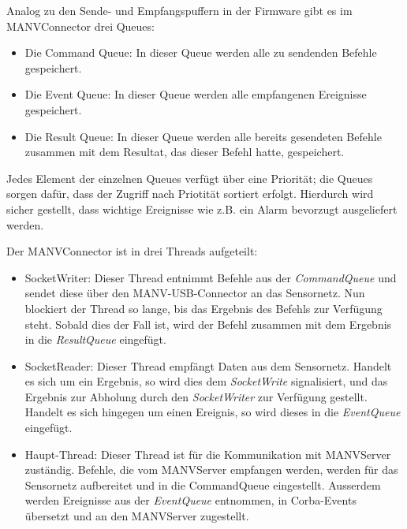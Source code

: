 Analog zu den Sende- und Empfangspuffern in der Firmware gibt es im MANVConnector drei Queues:

\begin{itemize}
    \item{Die Command Queue:} In dieser Queue werden alle zu sendenden Befehle gespeichert.
    \item{Die Event Queue:} In dieser Queue werden alle empfangenen Ereignisse gespeichert.
    \item{Die Result Queue:} In dieser Queue werden alle bereits gesendeten Befehle zusammen mit dem
                             Resultat, das dieser Befehl hatte, gespeichert.
\end{itemize}

Jedes Element der einzelnen Queues verfügt über eine Priorität; die Queues sorgen dafür, dass der
Zugriff nach Priotität sortiert erfolgt. Hierdurch wird sicher gestellt, dass wichtige Ereignisse
wie z.B. ein Alarm bevorzugt ausgeliefert werden.

Der MANVConnector ist in drei Threads aufgeteilt:

\begin{itemize}
    \item{SocketWriter:} Dieser Thread entnimmt Befehle aus der \textsl{CommandQueue} und sendet
                         diese über den MANV-USB-Connector an das Sensornetz. Nun blockiert der
                         Thread so lange, bis das Ergebnis des Befehls zur Verfügung steht.
                         Sobald dies der Fall ist, wird der Befehl zusammen mit dem Ergebnis in
                         die \textsl{ResultQueue} eingefügt.
    \item{SocketReader:} Dieser Thread empfängt Daten aus dem Sensornetz. Handelt es sich um ein
                         Ergebnis, so wird dies dem \textsl{SocketWrite} signalisiert, und das
                         Ergebnis zur Abholung durch den \textsl{SocketWriter} zur Verfügung
                         gestellt. Handelt es sich hingegen um einen Ereignis, so wird dieses
                         in die \textsl{EventQueue} eingefügt.
    \item{Haupt-Thread:} Dieser Thread ist für die Kommunikation mit MANVServer zuständig.
                         Befehle, die vom MANVServer empfangen werden, werden für das 
                         Sensornetz aufbereitet und in die CommandQueue eingestellt.
                         Ausserdem werden Ereignisse aus der \textsl{EventQueue} entnommen,
                         in Corba-Events übersetzt und an den MANVServer zugestellt.
\end{itemize}                          

